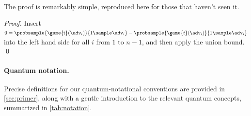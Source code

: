     The proof is remarkably simple, reproduced here for those that haven't
      seen it.

    \begin{proof}
      Insert $0 = \probsample{\game{i}(\adv_i)}{1 \sample \adv_i} -
      \probsample{\game{i}(\adv_i)}{1 \sample \adv_i}$ into the left hand side
      for all $i$ from $1$ to $n-1$, and then apply the union bound.
      \qed
    \end{proof}

  \paragraph{Quantum notation.}
    Precise definitions for our quantum-notational conventions are provided in
      \autoref{sec:primer},
      along with a gentle introduction to the relevant quantum concepts,
      summarized in \autoref{tab:notation}.

